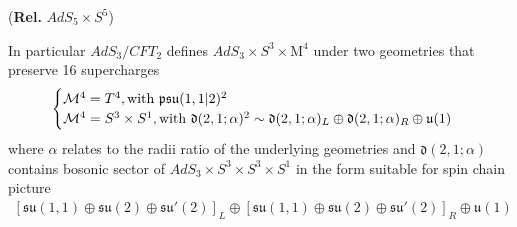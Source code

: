 \documentclass[12pt,a4paper]{article}
\numberwithin{equation}{section}
\newcommand{\alg}[1]{\mathfrak{#1}}
\begin{document}
(\textbf{Rel.} $ AdS_{5} \times S^{5} $)

In particular $ AdS_{3}/CFT_{2} $ defines $ AdS_{3} \times S^{3} \times \mathrm{M}^{4} $ under two geometries that preserve 16 supercharges
	\begin{equation*}
		\begin{cases}
			\mathcal{M}^{4} = T^{4}, \text{with } \alg{psu}(1,1\vert2)^{2} \\
			\mathcal{M}^{4} = S^{3} \times S^{1} , \text{with } \alg{d}(2,1;\alpha)^{2} \sim \alg{d}(2,1;\alpha)_{L} \oplus \alg{d}(2,1;\alpha)_{R} \oplus \alg{u}(1)\\
		\end{cases} 
		\vspace*{-2mm}
	\end{equation*}
where $ \alpha $ relates to the radii ratio of the underlying geometries and $ \alg{d}(2,1;\alpha) $ contains bosonic sector of $ AdS_{3} \times S^{3} \times S^{3} \times S^{1} $ in the form suitable for spin chain picture
\begin{align*}
	\left[ \alg{su}(1,1) \oplus \alg{su}(2) \oplus \alg{su}'(2) \right]_{L} \oplus \left[ \alg{su}(1,1) \oplus \alg{su}(2) \oplus \alg{su}'(2) \right]_{R} \oplus \alg{u}(1)
\end{align*}
\end{document}
